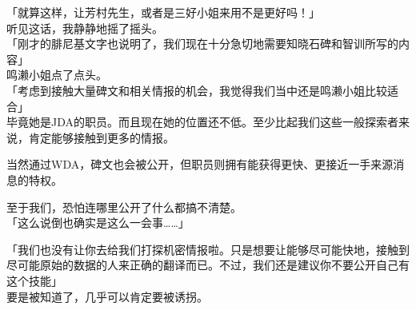 「就算这样，让芳村先生，或者是三好小姐来用不是更好吗！」\\

听见这话，我静静地摇了摇头。\\

「刚才的腓尼基文字也说明了，我们现在十分急切地需要知晓石碑和智训所写的内容」\\

鸣濑小姐点了点头。\\

「考虑到接触大量碑文和相关情报的机会，我觉得我们当中还是鸣濑小姐比较适合」\\

毕竟她是JDA的职员。而且现在她的位置还不低。至少比起我们这些一般探索者来说，肯定能够接触到更多的情报。

当然通过WDA，碑文也会被公开，但职员则拥有能获得更快、更接近一手来源消息的特权。

至于我们，恐怕连哪里公开了什么都搞不清楚。\\

「这么说倒也确实是这么一会事……」

「我们也没有让你去给我们打探机密情报啦。只是想要让能够尽可能快地，接触到尽可能原始的数据的人来正确的翻译而已。不过，我们还是建议你不要公开自己有这个技能」\\

要是被知道了，几乎可以肯定要被诱拐。

